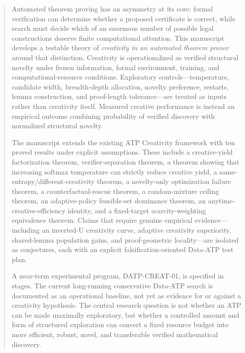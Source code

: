 \documentclass[11pt]{article}
\theoremstyle{datatheorem}
\theoremstyle{definition}
\begin{document}
\begin{abstract}
Automated theorem proving has an asymmetry at its core: formal verification can determine whether a proposed certificate is correct, while search must decide which of an enormous number of possible legal constructions deserve finite computational attention. This manuscript develops a testable theory of \emph{creativity in an automated theorem prover} around that distinction. Creativity is operationalized as verified structural novelty under frozen information, formal environment, training, and computational-resource conditions. Exploratory controls---temperature, candidate width, breadth-depth allocation, novelty preference, restarts, lemma construction, and proof-length tolerance---are treated as inputs rather than creativity itself. Measured creative performance is instead an empirical outcome combining probability of verified discovery with normalized structural novelty.

The manuscript extends the existing ATP Creativity framework with ten proved results under explicit assumptions. These include a creative-yield factorization theorem, verifier-separation theorem, a theorem showing that increasing softmax temperature can strictly reduce creative yield, a same-entropy/different-creativity theorem, a novelty-only optimization failure theorem, a counterfactual-rescue theorem, a random-mixture ceiling theorem, an adaptive-policy feasible-set dominance theorem, an anytime-creative-efficiency identity, and a fixed-target scarcity-weighting equivalence theorem. Claims that require genuine empirical evidence---including an inverted-U creativity curve, adaptive creativity superiority, shared-lemma population gains, and proof-geometric locality---are isolated as conjectures, each with an explicit falsification-oriented Data-ATP test plan.

A near-term experimental program, DATP-CREAT-01, is specified in stages. The current long-running conservative Data-ATP search is documented as an operational baseline, not yet as evidence for or against a creativity hypothesis. The central research question is not whether an ATP can be made maximally exploratory, but whether a controlled amount and form of structured exploration can convert a fixed resource budget into more efficient, robust, novel, and transferable verified mathematical discovery.
\end{abstract}

\clearpage
\tableofcontents
\clearpage
{}
\end{document}

